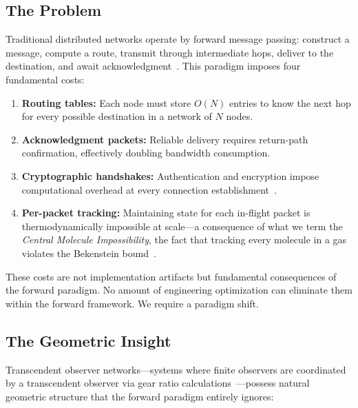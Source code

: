 \documentclass[11pt,twocolumn,a4paper]{article}
\theoremstyle{definition}
\begin{document}
\subsection{The Problem}\label{sec:intro:problem}

Traditional distributed networks operate by forward message passing: construct a message,
compute a route, transmit through intermediate hops, deliver to the destination, and
await acknowledgment~\cite{lamport1978}. This paradigm imposes four fundamental costs:

\begin{enumerate}[label=(\roman*)]
  \item \textbf{Routing tables:} Each node must store $O(N)$ entries to know the next hop
        for every possible destination in a network of $N$ nodes.
  \item \textbf{Acknowledgment packets:} Reliable delivery requires return-path
        confirmation, effectively doubling bandwidth consumption.
  \item \textbf{Cryptographic handshakes:} Authentication and encryption impose
        computational overhead at every connection establishment~\cite{rivest1978,diffie1976}.
  \item \textbf{Per-packet tracking:} Maintaining state for each in-flight packet is
        thermodynamically impossible at scale---a consequence of what we term the
        \emph{Central Molecule Impossibility}, the fact that tracking every molecule in a gas
        violates the Bekenstein bound~\cite{bekenstein1973}.
\end{enumerate}

These costs are not implementation artifacts but fundamental consequences of the
forward paradigm. No amount of engineering optimization can eliminate them within
the forward framework. We require a paradigm shift.

\subsection{The Geometric Insight}\label{sec:intro:geometry}

Transcendent observer networks---systems where finite observers are coordinated by a
transcendent observer via gear ratio calculations~\cite{sachikonye2024a,sachikonye2024b}---possess
natural geometric structure that the forward paradigm entirely ignores:
\end{document}
